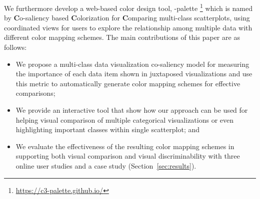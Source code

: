 We furthermore develop a web-based color design tool, \toolname-palette \footnote{\small \url{https://c3-palette.github.io/}} which is named by \textbf{C}o-saliency based \textbf{C}olorization for \textbf{C}omparing multi-class scatterplots, using coordinated views for users to explore the relationship among multiple data with different color mapping schemes. %
The main contributions of this paper are as follows:
\begin{itemize}[noitemsep]
\setlength{\itemsep}{5pt}
  \item We propose a multi-class data visualization co-saliency model for measuring the importance of each data item shown in juxtaposed visualizations and use this metric to automatically generate color mapping schemes for effective comparisons;
    \item
  We provide an interactive tool that show how our approach can be used for helping visual comparison of multiple categorical visualizations or even highlighting important classes within single scatterplot; and
  \item
   We evaluate the effectiveness of the resulting color mapping schemes in supporting both visual comparison and visual discriminability with three online user studies and a case study (Section~\ref{sec:results}).

\end{itemize}

